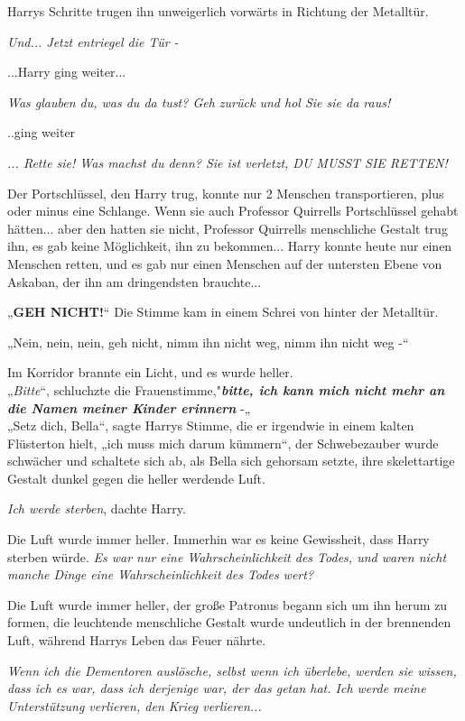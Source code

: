 {Harrys Schritte trugen ihn unweigerlich vorwärts in Richtung der Metalltür.

\emph{Und... Jetzt entriegel die Tür -}

...Harry ging weiter...

\emph{Was glauben du, was du da tust? Geh zurück und hol Sie sie da raus!}

..ging weiter

\emph{... Rette sie! Was machst du denn? Sie ist verletzt, DU MUSST SIE RETTEN!}

Der Portschlüssel, den Harry trug, konnte nur 2 Menschen transportieren, plus oder minus eine Schlange. Wenn sie auch Professor Quirrells Portschlüssel gehabt hätten... aber den hatten sie nicht, Professor Quirrells menschliche Gestalt trug ihn, es gab keine Möglichkeit, ihn zu bekommen... Harry konnte heute nur einen Menschen retten, und es gab nur einen Menschen auf der untersten Ebene von Askaban, der ihn am dringendsten brauchte...

„\textbf{GEH NICHT!}“ Die Stimme kam in einem Schrei von hinter der Metalltür.

\hfill\break

„Nein, nein, nein, geh nicht, nimm ihn nicht weg, nimm ihn nicht weg -“

Im Korridor brannte ein Licht, und es wurde heller.\\

\hfill\break „\emph{Bitte}“, schluchzte die Frauenstimme,"\textbf{\emph{bitte, ich kann mich nicht mehr an die Namen meiner Kinder erinnern}} -„\\

„Setz dich, Bella“, sagte Harrys Stimme, die er irgendwie in einem kalten Flüsterton hielt, „ich muss mich darum kümmern“, der Schwebezauber wurde schwächer und schaltete sich ab, als Bella sich gehorsam setzte, ihre skelettartige Gestalt dunkel gegen die heller werdende Luft.

\emph{Ich werde sterben}, dachte Harry.

Die Luft wurde immer heller. Immerhin war es keine Gewissheit, dass Harry sterben würde. \emph{Es war nur eine Wahrscheinlichkeit des Todes, und waren nicht manche Dinge eine Wahrscheinlichkeit des Todes wert?}

Die Luft wurde immer heller, der große Patronus begann sich um ihn herum zu formen, die leuchtende menschliche Gestalt wurde undeutlich in der brennenden Luft, während Harrys Leben das Feuer nährte.

\emph{Wenn ich die Dementoren auslösche, selbst wenn ich überlebe, werden sie wissen, dass ich es war, dass ich derjenige war, der das getan hat. Ich werde meine Unterstützung verlieren, den Krieg verlieren...}

}
